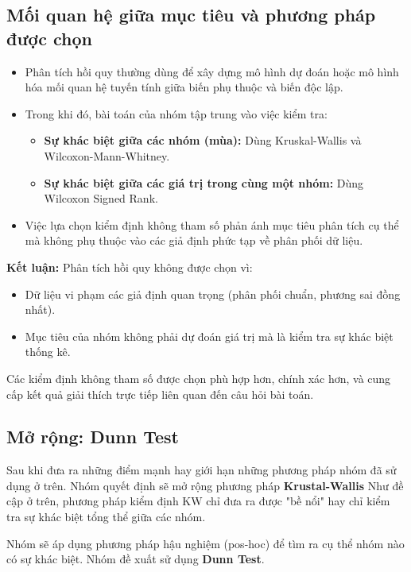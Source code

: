\subsection{Mối quan hệ giữa mục tiêu và phương pháp được chọn}

\begin{itemize}
    \item Phân tích hồi quy thường dùng để xây dựng mô hình dự đoán hoặc mô hình hóa mối quan hệ tuyến tính giữa biến phụ thuộc và biến độc lập.
    \item Trong khi đó, bài toán của nhóm tập trung vào việc kiểm tra:
    \begin{itemize}
        \item \textbf{Sự khác biệt giữa các nhóm (mùa):} Dùng Kruskal-Wallis và Wilcoxon-Mann-Whitney.
        \item \textbf{Sự khác biệt giữa các giá trị trong cùng một nhóm:} Dùng Wilcoxon Signed Rank.
    \end{itemize}
    \item Việc lựa chọn kiểm định không tham số phản ánh mục tiêu phân tích cụ thể mà không phụ thuộc vào các giả định phức tạp về phân phối dữ liệu.
\end{itemize}

\noindent
\textbf{Kết luận:}  
Phân tích hồi quy không được chọn vì:
\begin{itemize}
    \item Dữ liệu vi phạm các giả định quan trọng (phân phối chuẩn, phương sai đồng nhất).
    \item Mục tiêu của nhóm không phải dự đoán giá trị mà là kiểm tra sự khác biệt thống kê.
\end{itemize}
Các kiểm định không tham số được chọn phù hợp hơn, chính xác hơn, và cung cấp kết quả giải thích trực tiếp liên quan đến câu hỏi bài toán.

\subsection{Mở rộng: Dunn Test}
Sau khi đưa ra những điểm mạnh hay giới hạn những phương pháp nhóm đã sử dụng ở trên. Nhóm quyết định sẽ mở rộng phương pháp \textbf{Krustal-Wallis} 
Như đề cập ở trên, phương pháp kiểm định KW chỉ đưa ra được "bề nổi" hay chỉ kiểm tra sự khác biệt tổng thể giữa các nhóm.

\noindent Nhóm sẽ áp dụng phương pháp hậu nghiệm (pos-hoc) để tìm ra cụ thể nhóm nào có sự khác biệt. Nhóm đề xuất sử dụng \textbf{Dunn Test}.

